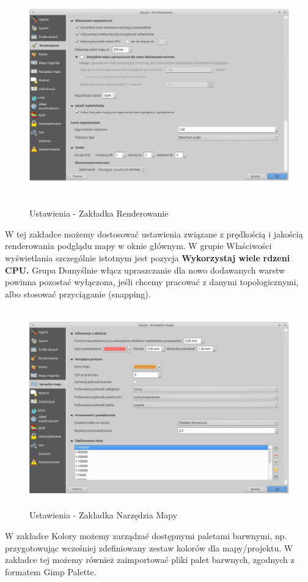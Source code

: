 \documentclass[12pt,a4paper]{book}
\begin{document}
\begin{center}
\begin{figure}
\includegraphics[width=13.014cm,height=9.275cm]{002-zakladka-renderowanie.jpg}
\caption{Ustawienia - Zakładka Renderowanie}
\end{figure}
\end{center}
W tej zakładce możemy dostosować ustawienia związane z prędkością i jakością renderowania podglądu mapy w oknie głównym. W grupie Właściwości wyświetlania szczególnie istotnym jest pozycja \textbf{Wykorzystaj wiele} \textbf{rdzeni CPU.} Grupa Domyślnie włącz upraszczanie dla nowo dodawanych warstw powinna pozostać wyłączona, jeśli chcemy pracować z danymi topologicznymi, albo stosować przyciąganie (snapping).

\begin{center}
\begin{figure}
\includegraphics[width=17cm,height=8.562cm]{002-zakladka-narzedzia.jpg}
\caption{Ustawienia - Zakładka Narzędzia Mapy}
\end{figure}
\end{center}
W zakładce Kolory możemy zarządzać dostępnymi paletami barwnymi, np. przygotowując wcześniej zdefiniowany zestaw kolorów dla mapy/projektu. W zakładce tej możemy również zaimportować pliki palet barwnych, zgodnych z formatem Gimp Palette.
\end{document}
